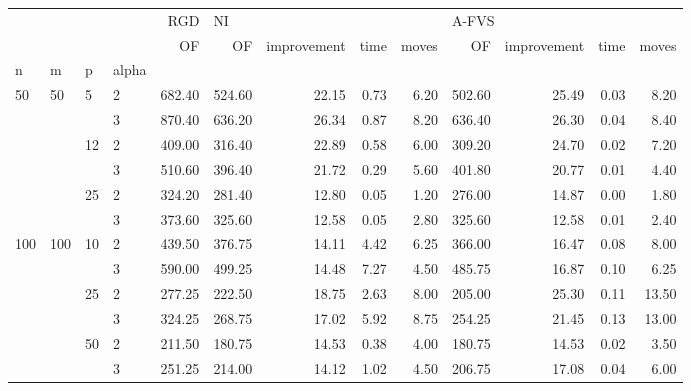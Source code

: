 \begin{tabular}{llllrrrrrrrrr}
\toprule
    &     &     &   &    RGD & \multicolumn{4}{l}{NI} & \multicolumn{4}{l}{A-FVS} \\
    &     &     &   &     OF &     OF & improvement &   time & moves &     OF & improvement & time & moves \\
n & m & p & alpha &        &        &             &        &       &        &             &      &       \\
\midrule
\multirow{6}{*}{50} & \multirow{6}{*}{50} & \multirow{2}{*}{5} & 2 & 682.40 & 524.60 &       22.15 &   0.73 &  6.20 & 502.60 &       25.49 & 0.03 &  8.20 \\
    &     &     & 3 & 870.40 & 636.20 &       26.34 &   0.87 &  8.20 & 636.40 &       26.30 & 0.04 &  8.40 \\
\cline{3-13}
    &     & \multirow{2}{*}{12} & 2 & 409.00 & 316.40 &       22.89 &   0.58 &  6.00 & 309.20 &       24.70 & 0.02 &  7.20 \\
    &     &     & 3 & 510.60 & 396.40 &       21.72 &   0.29 &  5.60 & 401.80 &       20.77 & 0.01 &  4.40 \\
\cline{3-13}
    &     & \multirow{2}{*}{25} & 2 & 324.20 & 281.40 &       12.80 &   0.05 &  1.20 & 276.00 &       14.87 & 0.00 &  1.80 \\
    &     &     & 3 & 373.60 & 325.60 &       12.58 &   0.05 &  2.80 & 325.60 &       12.58 & 0.01 &  2.40 \\
\cline{1-13}
\cline{2-13}
\cline{3-13}
\multirow{6}{*}{100} & \multirow{6}{*}{100} & \multirow{2}{*}{10} & 2 & 439.50 & 376.75 &       14.11 &   4.42 &  6.25 & 366.00 &       16.47 & 0.08 &  8.00 \\
    &     &     & 3 & 590.00 & 499.25 &       14.48 &   7.27 &  4.50 & 485.75 &       16.87 & 0.10 &  6.25 \\
\cline{3-13}
    &     & \multirow{2}{*}{25} & 2 & 277.25 & 222.50 &       18.75 &   2.63 &  8.00 & 205.00 &       25.30 & 0.11 & 13.50 \\
    &     &     & 3 & 324.25 & 268.75 &       17.02 &   5.92 &  8.75 & 254.25 &       21.45 & 0.13 & 13.00 \\
\cline{3-13}
    &     & \multirow{2}{*}{50} & 2 & 211.50 & 180.75 &       14.53 &   0.38 &  4.00 & 180.75 &       14.53 & 0.02 &  3.50 \\
    &     &     & 3 & 251.25 & 214.00 &       14.12 &   1.02 &  4.50 & 206.75 &       17.08 & 0.04 &  6.00 \\
\cline{1-13}
\cline{2-13}
\cline{3-13}

\end{tabular}
